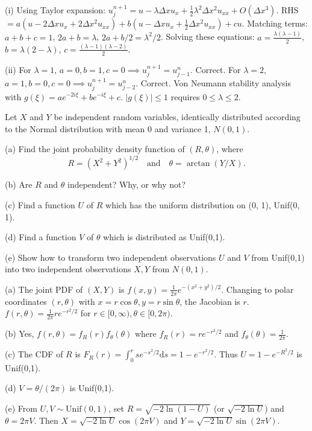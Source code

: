 \begin{solution}
(i) Using Taylor expansion:
$u_j^{n+1} = u - \lambda \Delta x u_x + \frac{1}{2} \lambda^2 \Delta x^2 u_{xx} + O(\Delta x^3)$.
RHS $= a(u - 2\Delta x u_x + 2\Delta x^2 u_{xx}) + b(u - \Delta x u_x + \frac{1}{2} \Delta x^2 u_{xx}) + c u$.
Matching terms:
$a+b+c = 1$, $2a+b = \lambda$, $2a + b/2 = \lambda^2/2$.
Solving these equations: $a = \frac{\lambda(\lambda-1)}{2}$, $b = \lambda(2-\lambda)$, $c = \frac{(\lambda-1)(\lambda-2)}{2}$.

(ii) For $\lambda=1$, $a=0, b=1, c=0 \implies u_j^{n+1} = u_{j-1}^n$. Correct.
For $\lambda=2$, $a=1, b=0, c=0 \implies u_j^{n+1} = u_{j-2}^n$. Correct.
Von Neumann stability analysis with $g(\xi) = a e^{-2i\xi} + b e^{-i\xi} + c$.
$|g(\xi)| \le 1$ requires $0 \le \lambda \le 2$.
\end{solution}

\begin{exercise}
\label{applied:2011:9}
Let $X$ and $Y$ be independent random variables, identically distributed according to the Normal distribution with mean 0 and variance 1, $N ( 0 , 1 )$.

(a) Find the joint probability density function of $( R , \theta )$, where
\[
R = (X ^ {2} + Y ^ {2}) ^ {1 / 2} \quad \text {and} \quad \theta = \arctan (Y / X).
\]

(b) Are $R$ and $\theta$ independent? Why, or why not?

(c) Find a function $U$ of $R$ which has the uniform distribution on (0, 1), Unif(0, 1).

(d) Find a function $V$ of $\theta$ which is distributed as Unif(0,1).

(e) Show how to transform two independent observations $U$ and $V$ from Unif(0,1) into two independent observations $X, Y$ from $N ( 0 , 1 )$.
\end{exercise}

\begin{solution}
(a) The joint PDF of $(X, Y)$ is $f(x, y) = \frac{1}{2\pi} e^{-(x^2+y^2)/2}$. Changing to polar coordinates $(r, \theta)$ with $x=r \cos \theta, y=r \sin \theta$, the Jacobian is $r$.
$f(r, \theta) = \frac{1}{2\pi} r e^{-r^2/2}$ for $r \in [0, \infty), \theta \in [0, 2\pi)$.

(b) Yes, $f(r, \theta) = f_R(r) f_\theta(\theta)$ where $f_R(r) = r e^{-r^2/2}$ and $f_\theta(\theta) = \frac{1}{2\pi}$.

(c) The CDF of $R$ is $F_R(r) = \int_0^r s e^{-s^2/2} \mathrm{d} s = 1 - e^{-r^2/2}$. Thus $U = 1 - e^{-R^2/2}$ is Unif(0,1).

(d) $V = \theta / (2\pi)$ is Unif(0,1).

(e) From $U, V \sim \text{Unif}(0,1)$, set $R = \sqrt{-2 \ln(1-U)}$ (or $\sqrt{-2 \ln U}$) and $\theta = 2\pi V$.
Then $X = \sqrt{-2 \ln U} \cos(2\pi V)$ and $Y = \sqrt{-2 \ln U} \sin(2\pi V)$.
\end{solution}

